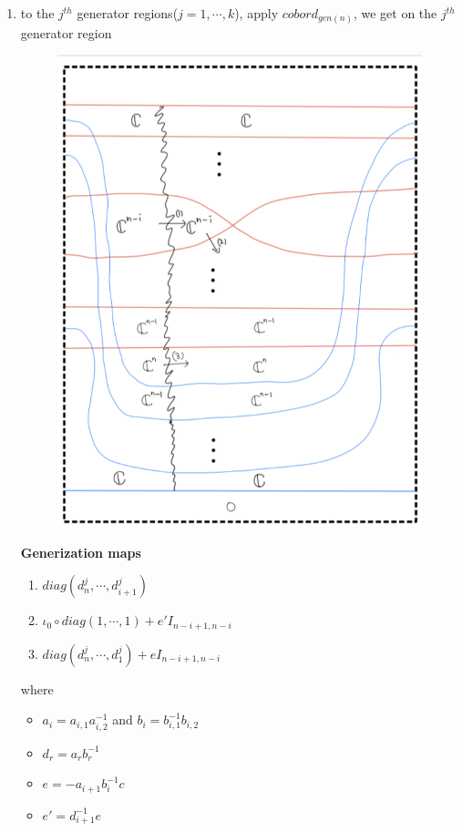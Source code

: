 \begin{enumerate}[label = (Step \arabic*)]
\item to the $j^{th}$ generator regions($j=1,\cdots,k$), apply $cobord_{gen(n)}$, we get on the $j^{th}$ generator region
\begin{figure}[H]
    \centering
    \includegraphics[scale = 0.95]{diagrams/cobord_full/3.png}
    \caption{}
    \label{fig:your-label}
\end{figure}
\textbf{Generization maps}
\begin{enumerate}
\item $diag(d^j_n,\cdots, d^j_{i+1})$
\item $\iota_0 \circ diag(1,\cdots, 1) + e'I_{n-i+1,n-i}$
\item $diag(d^j_n,\cdots, d^j_{1})+ eI_{n-i+1,n-i}$
\end{enumerate}
where
\begin{itemize}
\item $a_i=a_{i,1}a_{i,2}^{-1}$ and $b_i=b_{i,1}^{-1}b_{i,2}$
\item $d_r = a_rb_r^{-1}$
\item $e = -a_{i+1}b_i^{-1}c$
\item $e' = d_{i+1}^{-1}e$
\end{itemize}


\end{enumerate}
